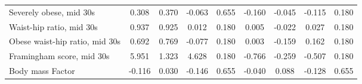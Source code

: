 \begin{tabular}{l c c c r c c c r}
Severely obese, mid 30s & 0.308 & 0.370 & -0.063 & 0.655 & -0.160 & -0.045 & -0.115 & 0.180 \\
Waist-hip ratio, mid 30s & 0.937 & 0.925 & 0.012 & 0.180 & 0.005 & -0.022 & 0.027 & 0.180 \\
Obese waist-hip ratio, mid 30s & 0.692 & 0.769 & -0.077 & 0.180 & 0.003 & -0.159 & 0.162 & 0.180 \\
Framingham score, mid 30s & 5.951 & 1.323 & 4.628 & 0.180 & -0.766 & -0.259 & -0.507 & 0.180 \\
Body mass Factor & -0.116 & 0.030 & -0.146 & 0.655 & -0.040 & 0.088 & -0.128 & 0.655 \\
\bottomrule
\end{tabular}
